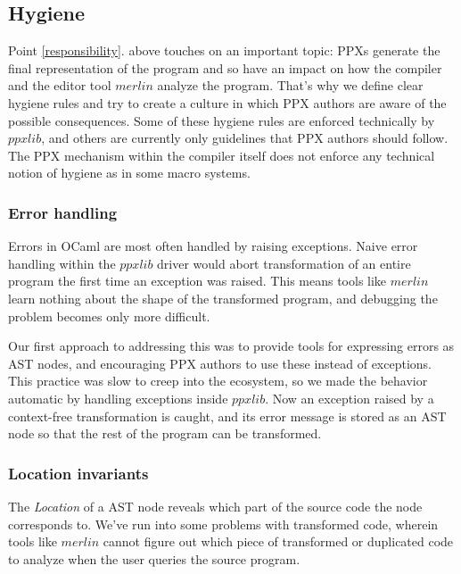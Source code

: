 \documentclass[10pt, a4paper, twocolumn]{article}
\begin{document}
\subsection{Hygiene}

Point \ref{responsibility}. above touches on an important topic: PPXs generate
the final representation of the program and so have an impact on how the
compiler and the editor tool $merlin$ analyze the program. That's why we define
clear hygiene rules\cite{hygiene} and try to create a culture in which PPX
authors are aware of the possible consequences. Some of these hygiene rules are
enforced technically by $ppxlib$, and others are currently only guidelines that
PPX authors should follow. The PPX mechanism within the compiler itself does not
enforce any technical notion of hygiene as in some macro
systems\cite{scheme_hygiene}.

\subsubsection*{Error handling}

Errors in OCaml are most often handled by raising exceptions. Naive error
handling within the $ppxlib$ driver would abort transformation of an entire
program the first time an exception was raised. This means tools like $merlin$
learn nothing about the shape of the transformed program, and debugging the
problem becomes only more difficult.

Our first approach to addressing this was to provide tools for expressing errors
as AST nodes, and encouraging PPX authors to use these instead of exceptions.
This practice was slow to creep into the ecosystem, so we made the behavior
automatic by handling exceptions inside $ppxlib$. Now an exception raised by a
context-free transformation is caught, and its error message is stored as an AST
node so that the rest of the program can be transformed.

\subsubsection*{Location invariants}

The \emph{Location} of a AST node reveals which part of the source code the node
corresponds to. We've run into some problems with transformed code, wherein
tools like $merlin$ cannot figure out which piece of transformed or duplicated
code to analyze when the user queries the source program.
\end{document}
